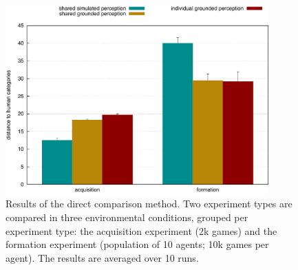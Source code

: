 \begin{figure}[htbp]
\begin{center}
  \includegraphics[width=0.9\textwidth]{./experiments/figures/grounding-comparison-distance-to-human-categories.pdf}
  \caption[Direct comparison between formed grounded colour category
  systems and the English colour categories]{Results of the direct
    comparison method. Two experiment types are compared in three
    environmental conditions, grouped per experiment type: the
    acquisition experiment (2k games) and the formation experiment
    (population of 10 agents; 10k games per agent). The results are
    averaged over 10 runs.}
\label{f:comparison-distance-to-human-categories}
\end{center}
\end{figure}

